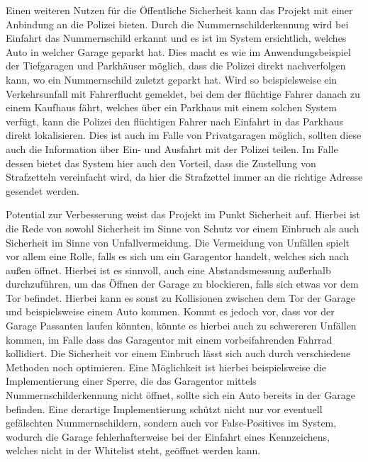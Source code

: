 Einen weiteren Nutzen für die Öffentliche Sicherheit kann das Projekt mit einer Anbindung an die Polizei bieten. Durch die Nummernschilderkennung wird bei Einfahrt das Nummernschild erkannt und es ist im System ersichtlich, welches Auto in welcher Garage geparkt hat. Dies macht es wie im Anwendungsbeispiel der Tiefgaragen und Parkhäuser möglich, dass die Polizei direkt nachverfolgen kann, wo ein Nummernschild zuletzt geparkt hat. Wird so beispielsweise ein Verkehrsunfall mit Fahrerflucht gemeldet, bei dem der flüchtige Fahrer danach zu einem Kaufhaus fährt, welches über ein Parkhaus mit einem solchen System verfügt, kann die Polizei den flüchtigen Fahrer nach Einfahrt in das Parkhaus direkt lokalisieren. Dies ist auch im Falle von Privatgaragen möglich, sollten diese auch die Information über Ein- und Ausfahrt mit der Polizei teilen. Im Falle dessen bietet das System hier auch den Vorteil, dass die Zustellung von Strafzetteln vereinfacht wird, da hier die Strafzettel immer an die richtige Adresse gesendet werden.

Potential zur Verbesserung weist das Projekt im Punkt Sicherheit auf. Hierbei ist die Rede von sowohl Sicherheit im Sinne von Schutz vor einem Einbruch als auch Sicherheit im Sinne von Unfallvermeidung. Die Vermeidung von Unfällen spielt vor allem eine Rolle, falls es sich um ein Garagentor handelt, welches sich nach außen öffnet. Hierbei ist es sinnvoll, auch eine Abstandsmessung außerhalb durchzuführen, um das Öffnen der Garage zu blockieren, falls sich etwas vor dem Tor befindet. Hierbei kann es sonst zu Kollisionen zwischen dem Tor der Garage und beispielsweise einem Auto kommen. Kommt es jedoch vor, dass vor der Garage Passanten laufen könnten, könnte es hierbei auch zu schwereren Unfällen kommen, im Falle dass das Garagentor mit einem vorbeifahrenden Fahrrad kollidiert.
Die Sicherheit vor einem Einbruch lässt sich auch durch verschiedene Methoden noch optimieren. Eine Möglichkeit ist hierbei beispielsweise die Implementierung einer Sperre, die das Garagentor mittels Nummernschilderkennung nicht öffnet, sollte sich ein Auto bereits in der Garage befinden. Eine derartige Implementierung schützt nicht nur vor eventuell gefälschten Nummernschildern, sondern auch vor False-Positives im System, wodurch die Garage fehlerhafterweise bei der Einfahrt eines Kennzeichens, welches nicht in der Whitelist steht, geöffnet werden kann. 
